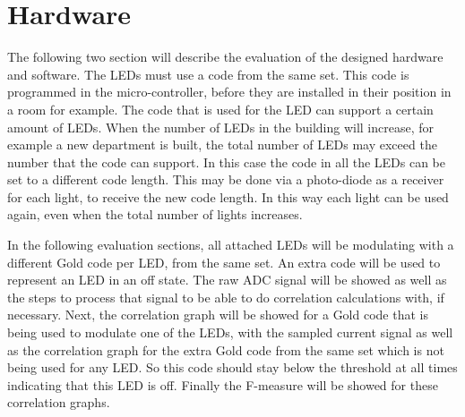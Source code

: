 
\section{Hardware}
\label{sec:hardware-evaluation}

The following two section will describe the evaluation of the designed hardware and software.
The LEDs must use a code from the same set.
This code is programmed in the micro-controller, before they are installed in their position in a room for example.
The code that is used for the LED can support a certain amount of LEDs.
When the number of LEDs in the building will increase, for example a new department is built, the total number of LEDs may exceed the number that the code can support.
In this case the code in all the LEDs can be set to a different code length.
This may be done via a photo-diode as a receiver for each light, to receive the new code length.
In this way each light can be used again, even when the total number of lights increases.


In the following evaluation sections, all attached LEDs will be modulating with a different Gold code per LED, from the same set.
An extra code will be used to represent an LED in an off state.
The raw ADC signal will be showed as well as the steps to process that signal to be able to do correlation calculations with, if necessary.
Next, the correlation graph will be showed for a Gold code that is being used to modulate one of the LEDs, with the sampled current signal as well as the correlation graph for the extra Gold code from the same set which is not being used for any LED. So this code should stay below the threshold at all times indicating that this LED is off.
Finally the F-measure will be showed for these correlation graphs.











